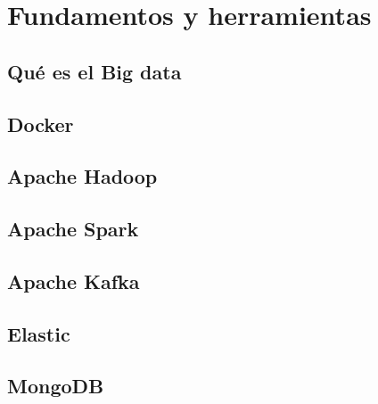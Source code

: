 \section{Fundamentos y herramientas\label{FunAndTools}}


\subsection{Qué es el Big data\label{WhatIsBigD}}
\subsection{Docker\label{Docker}}
\subsection{Apache Hadoop\label{Hadoop}}
\subsection{Apache Spark\label{Spark}}
\subsection{Apache Kafka\label{Kafka}}
\subsection{Elastic\label{Elastic}}
\subsection{MongoDB\label{MongoDB}}
